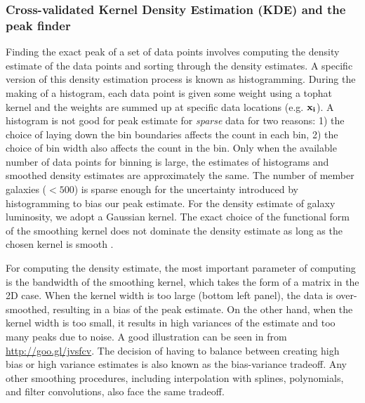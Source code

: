 \subsubsection{Cross-validated Kernel Density Estimation (KDE) and the peak finder} 
\label{subsubsec:KDE}
Finding the exact peak of a set of data points 
involves computing the density estimate of the data points and sorting through
the density estimates. A specific version of this density estimation process is
known as histogramming. During the making of a histogram, each data point is
given some weight using a tophat kernel and the weights are summed up at
specific data locations (e.g. $\bf{x}_i$). 
A histogram is not good for peak estimate for {\it sparse} data for two reasons: 1) the
choice of laying down the bin boundaries affects the count in each bin, 2) the choice of
bin width also affects the count in the bin. Only when the available number of data points
for binning is large, the estimates of histograms and smoothed density
estimates are approximately the same. The number of member galaxies ($< 500$) 
is sparse enough for the uncertainty introduced by histogramming to bias our
peak estimate. For the density estimate of galaxy luminosity, 
we adopt a Gaussian kernel. 
The exact choice of the functional form of the smoothing kernel does
not dominate the density estimate as long as the chosen kernel is
smooth \citep{Feigelson2014}. 

For computing the density estimate, the most important parameter of computing 
is the bandwidth of the smoothing kernel, 
which takes the form of a matrix in the 2D case. 
When the kernel width is
too large (bottom left panel), the data is over-smoothed, 
resulting in a bias of the peak estimate. On the other hand, when the kernel
width is too small, it results in high variances of the estimate and 
too many peaks due to noise. 
A good illustration can be seen in \citealt{Vanderplas2012} from 
\href{http://www.astroml.org/book\_figures/chapter6/fig\_hist\_to\_kernel.html}{http://goo.gl/jvsfcv}.
The decision of having to balance between creating high
bias or high variance estimates is also known as the bias-variance tradeoff. 
Any other smoothing procedures, including interpolation with splines,
polynomials, and filter convolutions, also face the same tradeoff. 

